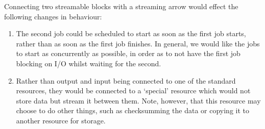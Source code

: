 \documentclass[10pt,a4paper]{article}
\newcommand{\npar}{\par\noindent\space}
\begin{document}
\npar Connecting two streamable blocks with a streaming arrow would effect the following changes in behaviour:
\begin{enumerate}
\item The second job could be scheduled to start as soon as the first job starts, rather than as soon as the first job finishes. In general, we would like the jobs to start as concurrently as possible, in order as to not have the first job blocking on I/O whilst waiting for the second.
\item Rather than output and input being connected to one of the standard resources, they would be connected to a `special' resource which would not store data but stream it between them. Note, however, that this resource may choose to do other things, such as checksumming the data or copying it to another resource for storage.
\end{enumerate}
\end{document}

